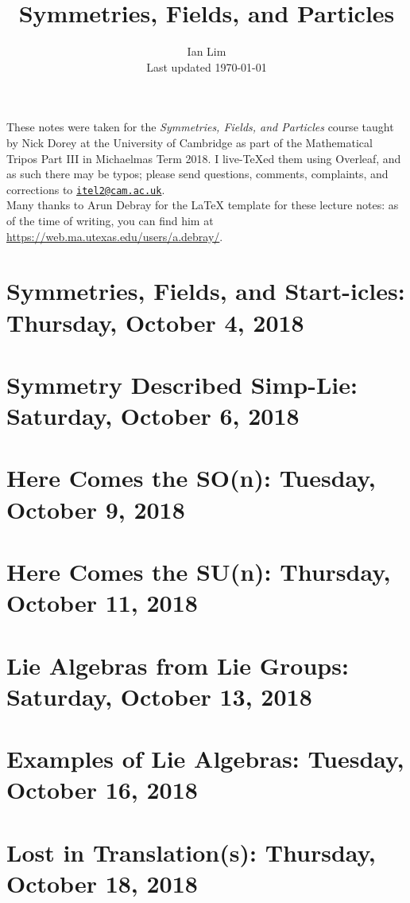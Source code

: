 \documentclass[reqno]{amsart}
\begin{document}
\title{Symmetries, Fields, and Particles}
\author{Ian Lim\\ Last updated \today}
\maketitle
{\small\noindent These notes were taken for the \textit{Symmetries, Fields, and Particles} course taught by Nick Dorey at the University of Cambridge as part of the Mathematical Tripos Part III in Michaelmas Term 2018. I live-\TeX ed them using Overleaf, and as such there may be typos; please send questions, comments, complaints, and corrections to 
\href{mailto:itel2@cam.ac.uk?subject=SFP\%20Lecture\%20Notes}{\texttt{itel2@cam.ac.uk}}.\\
Many thanks to Arun Debray for the {\LaTeX} template for these lecture notes: as of the time of writing, you can find him at \url{https://web.ma.utexas.edu/users/a.debray/}.}

\tableofcontents

\section{Symmetries, Fields, and Start-icles: Thursday, October 4, 2018}
	
\section{Symmetry Described Simp-Lie: Saturday, October 6, 2018}
	
\section{Here Comes the SO(n): Tuesday, October 9, 2018}
	
\section{Here Comes the SU(n): Thursday, October 11, 2018}
	
\section{Lie Algebras from Lie Groups: Saturday, October 13, 2018}
	
\section{Examples of Lie Algebras: Tuesday, October 16, 2018}
	
\section{Lost in Translation(s): Thursday, October 18, 2018}
    
\end{document}
